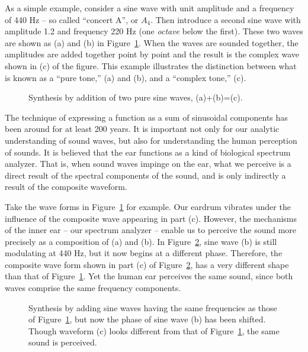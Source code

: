 As a simple example, consider a sine wave with unit amplitude and a
frequency of 440 Hz -- so called ``concert A'', or $A_4$.  Then
introduce a second sine wave with amplitude 1.2 and frequency 220 Hz
(one \emph{octave} below the first).  These two waves are shown as (a)
and (b) in Figure~\ref{fig:synth1}.  When the waves are sounded
together, the amplitudes are added together point by point and the
result is the complex wave shown in (c) of the figure.  This example
illustrates the distinction between what is known as a ``pure tone,''
(a) and (b), and a ``complex tone,'' (c). 
\begin{figure}
\caption{Synthesis by addition of two pure sine waves, (a)+(b)=(c).}
\label{fig:synth1}
\end{figure}

The technique of expressing a function as a sum of sinusoidal
components has been around for at least 200 years.  It is important
not only for our analytic understanding of sound waves, but also for
understanding the human perception of sounds.  It is believed that the 
ear functions as a kind of biological spectrum analyzer.  That is,
when sound waves impinge on the ear, what we perceive is a direct
result of the spectral components of the sound, and is only indirectly
a result of the composite waveform.

Take the wave forms in Figure~\ref{fig:synth1} for example.  Our eardrum
vibrates under the influence of the composite wave appearing in part (c).
However, the mechanisms of the inner ear -- our spectrum analyzer --
enable us to perceive the sound more precisely as a composition of (a)
and (b).  In Figure~\ref{fig:synth2}, sine wave (b) is still
modulating at 440 Hz, but it now begins at a different phase.
Therefore, the composite wave form shown in part (c) of
Figure~\ref{fig:synth2}, has a very different shape than that of
Figure~\ref{fig:synth1}. Yet the human ear perceives the same sound,
since both waves comprise the same frequency components.  
\begin{figure}
\caption{Synthesis by adding sine waves having the same frequencies as
those of Figure~\ref{fig:synth1}, but now the phase of sine wave (b) has
been shifted. Though waveform (c) looks different from that of
Figure~\ref{fig:synth1}, the same sound is perceived.}
\label{fig:synth2}
\end{figure}

